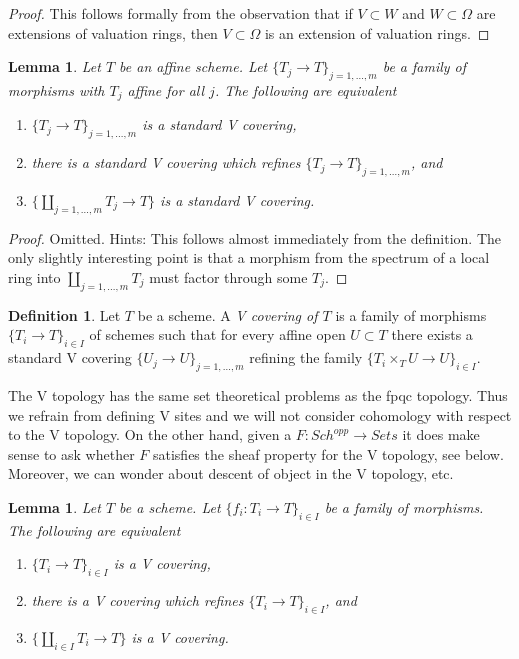 \documentclass{stacks-project}
\theoremstyle{plain}
\newtheorem{lemma}[subsection]{Lemma}
\theoremstyle{definition}
\newtheorem{definition}[subsection]{Definition}
\theoremstyle{remark}
\numberwithin{equation}{subsection}
\def\Sch{\mathit{Sch}}
\begin{document}
\begin{proof}
This follows formally from the observation that if
$V \subset W$ and $W \subset \Omega$ are extensions of
valuation rings, then $V \subset \Omega$ is an extension
of valuation rings.
\end{proof}

\begin{lemma}
\label{lemma-refine-standard-V}
Let $T$ be an affine scheme. Let $\{T_j \to T\}_{j = 1, \ldots, m}$
be a family of morphisms with $T_j$ affine for all $j$.
The following are equivalent
\begin{enumerate}
\item $\{T_j \to T\}_{j = 1, \ldots, m}$ is a standard V covering,
\item there is a standard V covering which refines
$\{T_j \to T\}_{j = 1, \ldots, m}$, and
\item $\{\coprod_{j = 1, \ldots, m} T_j \to T\}$ is a standard
V covering.
\end{enumerate}
\end{lemma}

\begin{proof}
Omitted. Hints: This follows almost immediately from the definition.
The only slightly interesting point is that
a morphism from the spectrum of a local ring into
$\coprod_{j = 1, \ldots, m} T_j$ must factor through some $T_j$.
\end{proof}

\begin{definition}
\label{definition-V-covering}
Let $T$ be a scheme. A {\it V covering of $T$} is a family
of morphisms $\{T_i \to T\}_{i \in I}$ of schemes such that for every
affine open $U \subset T$ there exists a standard V covering
$\{U_j \to U\}_{j = 1, \ldots, m}$ refining the family
$\{T_i \times_T U \to U\}_{i \in I}$.
\end{definition}

\noindent
The V topology has the same set theoretical problems as
the fpqc topology. Thus we refrain from defining V sites
and we will not consider cohomology with respect to the V topology.
On the other hand, given a 
$F : \Sch^{opp} \to \textit{Sets}$
it does make sense to ask whether $F$ satisfies the sheaf property
for the V topology, see below.
Moreover, we can wonder about descent of object
in the V topology, etc.

\begin{lemma}
\label{lemma-refine-by-V}
Let $T$ be a scheme. Let $\{f_i : T_i \to T\}_{i \in I}$ be a family
of morphisms. The following are equivalent
\begin{enumerate}
\item $\{T_i \to T\}_{i \in I}$ is a V covering,
\item there is a V covering which refines $\{T_i \to T\}_{i \in I}$, and
\item $\{\coprod_{i \in I} T_i \to T\}$ is a V covering.
\end{enumerate}
\end{lemma}
\end{document}
